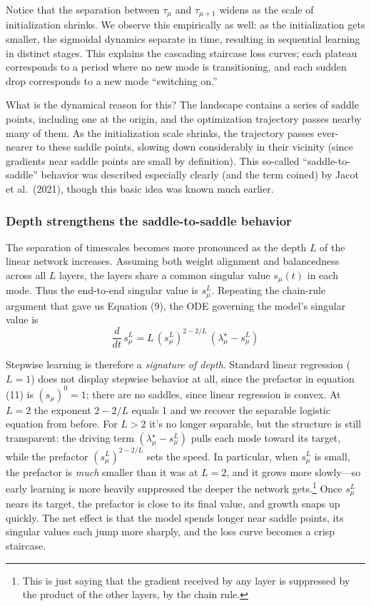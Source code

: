 \documentclass[12pt]{article}
\begin{document}
Notice that the separation between $\tau_\mu$ and $\tau_{\mu+1}$ widens as the scale of initialization shrinks. We observe this empirically as well: as the initialization gets smaller, the sigmoidal dynamics separate in time, resulting in sequential learning in distinct stages. This explains the cascading staircase loss curves; each plateau corresponds to a period where no new mode is transitioning, and each sudden drop corresponds to a new mode ``switching on.''

What is the dynamical reason for this? The landscape contains a series of saddle points, including one at the origin, and the optimization trajectory passes nearby many of them. As the initialization scale shrinks, the trajectory passes ever-nearer to these saddle points, slowing down considerably in their vicinity (since gradients near saddle points are small by definition). This so-called ``saddle-to-saddle'' behavior was described especially clearly (and the term coined) by Jacot et al.\ (2021), though this basic idea was known much earlier.

\subsubsection*{Depth strengthens the saddle-to-saddle behavior}

The separation of timescales becomes more pronounced as the depth $L$ of the linear network increases. Assuming both weight alignment and balancedness across all $L$ layers, the layers share a common singular value $s_\mu(t)$ in each mode. Thus the end-to-end singular value is $s_\mu^L$. Repeating the chain-rule argument that gave us Equation (9), the ODE governing the model's singular value is
\begin{equation}
    \frac{d}{dt}\, s_\mu^L = L \, (s_\mu^L)^{2 - 2/L}\,(\lambda^\star_\mu - s_\mu^L) \tag{11}
\end{equation}

Stepwise learning is therefore a \emph{signature of depth}. Standard linear regression ($L=1$) does not display stepwise behavior at all, since the prefactor in equation (11) is $(s_\mu)^0 = 1$; there are no saddles, since linear regression is convex. At $L=2$ the exponent $2-2/L$ equals 1 and we recover the separable logistic equation from before. For $L > 2$ it's no longer separable, but the structure is still transparent: the driving term $(\lambda^\star_\mu - s_\mu^L)$ pulls each mode toward its target, while the prefactor $(s_\mu^L)^{2-2/L}$ sets the speed. In particular, when $s_\mu^L$ is small, the prefactor is \emph{much} smaller than it was at $L=2$, and it grows more slowly---so early learning is more heavily suppressed the deeper the network gets.\footnote{This is just saying that the gradient received by any layer is suppressed by the product of the other layers, by the chain rule.} Once $s_\mu^L$ nears its target, the prefactor is close to its final value, and growth snaps up quickly. The net effect is that the model spends longer near saddle points, its singular values each jump more sharply, and the loss curve becomes a crisp staircase.
\end{document}
